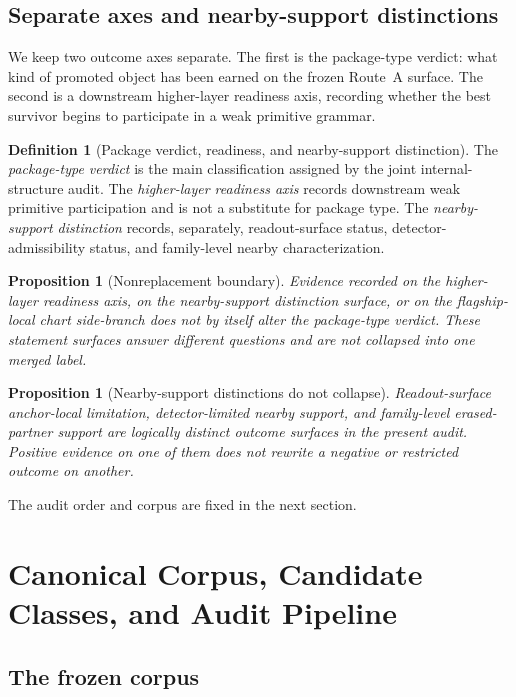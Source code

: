\documentclass[11pt]{article}
\newtheorem{proposition}[theorem]{Proposition}
\theoremstyle{definition}
\newtheorem{definition}[theorem]{Definition}
\begin{document}
\subsection{Separate axes and nearby-support distinctions}

We keep two outcome axes separate. The first is the package-type verdict: what kind of promoted object has been earned on the frozen Route~A surface. The second is a downstream higher-layer readiness axis, recording whether the best survivor begins to participate in a weak primitive grammar.

\begin{definition}[Package verdict, readiness, and nearby-support distinction]
\label{def:outcome-axes}
The \emph{package-type verdict} is the main classification assigned by the joint internal-structure audit. The \emph{higher-layer readiness axis} records downstream weak primitive participation and is not a substitute for package type. The \emph{nearby-support distinction} records, separately, readout-surface status, detector-admissibility status, and family-level nearby characterization.
\end{definition}

\begin{proposition}[Nonreplacement boundary]
\label{prop:nonreplacement-boundary}
Evidence recorded on the higher-layer readiness axis, on the nearby-support distinction surface, or on the flagship-local chart side-branch does not by itself alter the package-type verdict. These statement surfaces answer different questions and are not collapsed into one merged label.
\end{proposition}

\begin{proposition}[Nearby-support distinctions do not collapse]
\label{prop:nearby-distinction}
Readout-surface anchor-local limitation, detector-limited nearby support, and family-level erased-partner support are logically distinct outcome surfaces in the present audit. Positive evidence on one of them does not rewrite a negative or restricted outcome on another.
\end{proposition}

The audit order and corpus are fixed in the next section.
 \section{Canonical Corpus, Candidate Classes, and Audit Pipeline}

\subsection{The frozen corpus}
\end{document}
